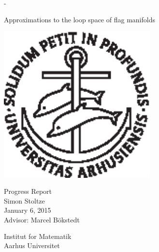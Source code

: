 \begin{titlingpage}
  \calccentering{\unitlength}
  \begin{adjustwidth*}{\unitlength}{-\unitlength}
    \begin{adjustwidth}{-1cm}{-1cm} 
      \vspace*{2cm}
      \centering
      \scshape
      
      {\Huge Approximations to the loop space of \newline\newline flag
        manifolds} \\
      
      \vspace*{3\onelineskip}
      
      \includegraphics[width=8cm]{billeder/segla1s.ps}    
      
      \vspace*{3\onelineskip}
      
      {\large
        \linespread{1.4}\selectfont
        Progress Report\\ 
        Simon Stoltze\\
        January 6, 2015\\
        Advisor: Marcel B\"okstedt\\ }
      
      \strut\vfill
      Institut for Matematik \\
      Aarhus Universitet
    \end{adjustwidth}
  \end{adjustwidth*}
  
\end{titlingpage}


